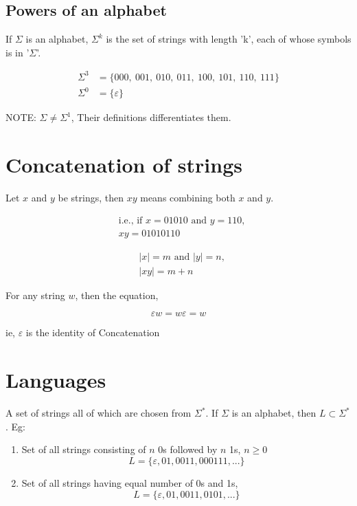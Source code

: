 \documentclass{article}
\begin{document}
\subsection{Powers of an alphabet}
If $\Sigma$ is an alphabet, $\Sigma^k$ is the set of strings with length 'k', each of whose symbols is in '$\Sigma$'.

\begin{align*}
    \Sigma^3 &= \{000,\ 001,\ 010,\ 011,\ 100,\ 101,\ 110,\ 111\} \\
    \Sigma^0 &= \{ \varepsilon \}
\end{align*}

NOTE: $\Sigma \neq \Sigma^1$, Their definitions differentiates them.

\section{Concatenation of strings}
Let $x$ and $y$ be strings, then $xy$ means combining both $x$ and $y$.

\begin{align*}
    &\text{i.e., if } x = 01010 \text{ and } y = 110, \\
    &xy = 01010110
\end{align*}

\begin{align*}
    &|x|=m \text{ and } |y| = n, \\
    &|xy| = m + n
\end{align*}

For any string $w$, then the equation,

\[ \varepsilon w = w \varepsilon = w \]

ie, $\varepsilon$ is the identity of Concatenation

\section{Languages}
A set of strings all of which are chosen from $\Sigma^*$. If $\Sigma$ is an alphabet, then $L \subset \Sigma^*$. Eg:

\begin{enumerate}
    \item Set of all strings consisting of $n$ 0s followed by $n$ 1s, $n \geq 0$
    \[
    L=\{\varepsilon, 01, 0011, 000111, ...\}
    \]
    \item Set of all strings having equal number of 0s and 1s,
    \[
    L=\{\varepsilon, 01, 0011, 0101, ...\}
    \]
\end{enumerate}
\end{document}
